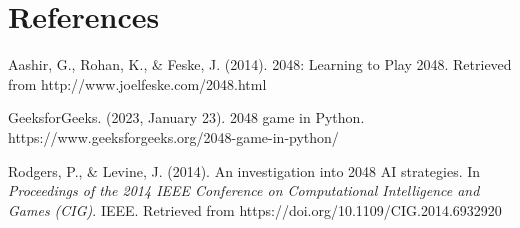 \documentclass[11pt]{article}
\begin{document}
\newpage
\section{References}

Aashir, G., Rohan, K., \& Feske, J. (2014). 2048: Learning to Play 2048. Retrieved from http://www.joelfeske.com/2048.html

\vspace{10pt}

GeeksforGeeks. (2023, January 23). 2048 game in Python. https://www.geeksforgeeks.org/2048-game-in-python/ 

\vspace{10pt}

Rodgers, P., \& Levine, J. (2014). An investigation into 2048 AI strategies. In \textit{Proceedings of the 2014 IEEE Conference on Computational Intelligence and Games (CIG)}. IEEE. Retrieved from https://doi.org/10.1109/CIG.2014.6932920
\end{document}
